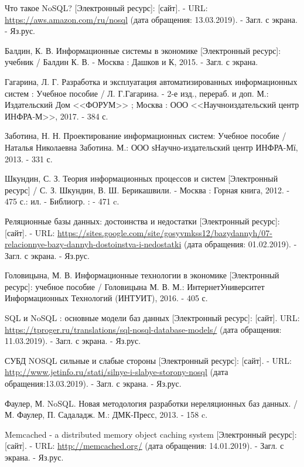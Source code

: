 \documentclass[14pt]{extreport}
\begin{document}
\newpage
\begin{thebibliography}{99}
 Что такое NoSQL? [Электронный ресурс]: [сайт]. - URL: \url{https://aws.amazon.com/ru/nosql} (дата обращения: 13.03.2019). - Загл. с экрана. - Яз.рус.

 Балдин, К. В. Информационные системы в экономике [Электронный ресурс]: учебник / Балдин К. В. - Москва : Дашков и К, 2015. - Загл. с экрана.

 Гагарина, Л. Г. Разработка и эксплуатация автоматизированных информационных систем : Учебное пособие / Л. Г.Гагарина. - 2-е изд., перераб. и доп.  М.: Издательский Дом <<ФОРУМ>> ; Москва : ООО <<Научноиздательский центр ИНФРА-М>>, 2017. - 384 с.

 Заботина, Н. Н. Проектирование информационных систем: Учебное пособие / Наталья Николаевна Заботина.  М.: ООО ѕНаучно-издательский центр ИНФРА-Мї, 2013. - 331 с.

 Шкундин, С. З. Теория информационных процессов и систем [Электронный ресурс] / С. З. Шкундин, В. Ш. Берикашвили. - Москва : Горная книга, 2012. - 475 с.: ил. - Библиогр. : - 471 c.

 Реляционные базы данных: достоинства и недостатки [Электронный
ресурс]: [сайт]. - URL: \url{https://sites.google.com/site/gosyvmkss12/bazydannyh/07-relacionnye-bazy-dannyh-dostoinstva-i-nedostatki} (дата обращения: 01.02.2019). - Загл. с экрана. - Яз.рус.

 Головицына, М. В. Информационные технологии в экономике [Электронный ресурс]: учебное пособие / Головицына М. В.  М.: ИнтернетУниверситет Информационных Технологий (ИНТУИТ), 2016. - 405 с.

 SQL и NoSQL : основные модели баз данных [Электронный ресурс]:
[сайт].  URL: \url{https://tproger.ru/translations/sql-nosql-database-models/}
(дата обращения: 11.03.2019). - Загл. с экрана. - Яз.рус.

 СУБД NOSQL  сильные и слабые стороны [Электронный ресурс]: [сайт].
- URL: \url{http://www.jetinfo.ru/stati/silnye-i-slabye-storony-nosql} (дата обращения:13.03.2019). - Загл. с экрана. - Яз.рус.

 Фаулер, М. NoSQL. Новая методология разработки нереляционных баз
данных. / М. Фаулер, П. Садаладж.  М.: ДМК-Пресс, 2013. - 158 c.

 Memcached - a distributed memory object caching system [Электронный ресурс]: [сайт]. - URL: 
\url{http://memcached.org/} (дата обращения: 14.01.2019). - Загл. с экрана. - Яз.рус.


\end{thebibliography}
\end{document}
